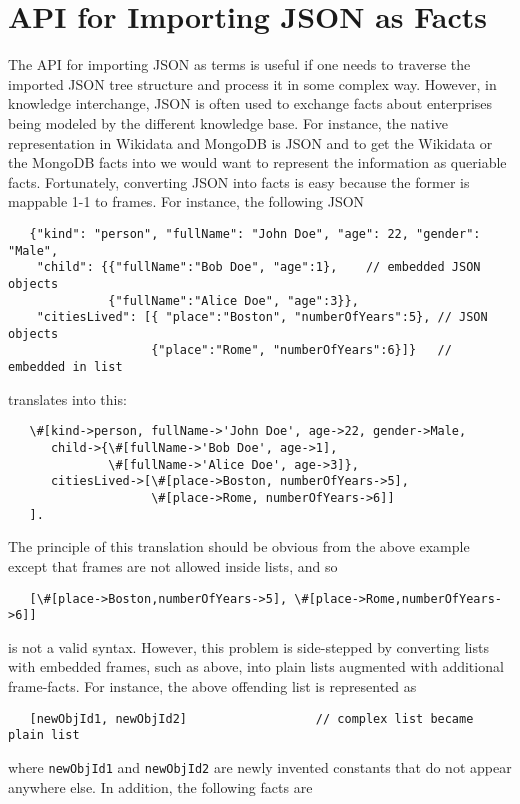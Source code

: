 \section{API for Importing JSON as Facts}

The API for importing JSON as terms is useful if one
needs to traverse the imported JSON tree structure and process it in some
complex way. However, in knowledge
interchange, JSON is often used to exchange facts about enterprises being
modeled by the different knowledge base. For instance, the native
representation in Wikidata and MongoDB is JSON and to get the Wikidata or the
MongoDB facts into \ERGO we would want to represent the information as
queriable facts.
Fortunately, converting JSON into \ERGO facts is easy because the former is
mappable 1-1 to \ERGO frames. For instance, the following JSON
\begin{verbatim}
   {"kind": "person", "fullName": "John Doe", "age": 22, "gender": "Male",
    "child": {{"fullName":"Bob Doe", "age":1},    // embedded JSON objects
              {"fullName":"Alice Doe", "age":3}},
    "citiesLived": [{ "place":"Boston", "numberOfYears":5}, // JSON objects
                    {"place":"Rome", "numberOfYears":6}]}   // embedded in list
\end{verbatim}
translates into this:
\begin{verbatim}
   \#[kind->person, fullName->'John Doe', age->22, gender->Male,
      child->{\#[fullName->'Bob Doe', age->1],
              \#[fullName->'Alice Doe', age->3]},
      citiesLived->[\#[place->Boston, numberOfYears->5],
                    \#[place->Rome, numberOfYears->6]]
   ].
\end{verbatim}
The principle of this translation
should be obvious from the above example except that frames
are not allowed inside lists, and so
\begin{verbatim}
   [\#[place->Boston,numberOfYears->5], \#[place->Rome,numberOfYears->6]]
\end{verbatim}
is not a valid \ERGO 
syntax. However, this problem is side-stepped by converting 
lists with embedded frames, such as above,
into plain lists augmented with additional
frame-facts. For instance, the above offending list is represented as
\begin{verbatim}
   [newObjId1, newObjId2]                  // complex list became plain list
\end{verbatim}
where \texttt{newObjId1}  and \texttt{newObjId2} 
are newly invented constants
that do not appear anywhere else. In addition, the following facts are
